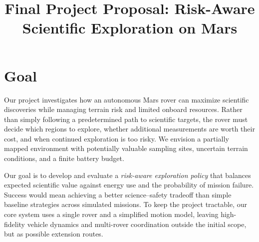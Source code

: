 \documentclass[twoside,11pt]{article}
\begin{document}
\title{Final Project Proposal: Risk-Aware Scientific Exploration on Mars}
\newcommand{\shorttitle}{Risk-Aware Mars Rover Exploration}



\maketitle

\section{Goal}
Our project investigates how an autonomous Mars rover can maximize scientific discoveries while managing terrain risk and limited onboard resources. Rather than simply following a predetermined path to scientific targets, the rover must decide which regions to explore, whether additional measurements are worth their cost, and when continued exploration is too risky. We envision a partially mapped environment with potentially valuable sampling sites, uncertain terrain conditions, and a finite battery budget.

Our goal is to develop and evaluate a \emph{risk-aware exploration policy} that balances expected scientific value against energy use and the probability of mission failure. Success would mean achieving a better science--safety tradeoff than simple baseline strategies across simulated missions. To keep the project tractable, our core system uses a single rover and a simplified motion model, leaving high-fidelity vehicle dynamics and multi-rover coordination outside the initial scope, but as possible extension routes. 
\end{document}
